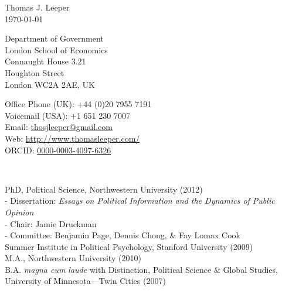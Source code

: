 \documentclass[12pt]{article}
\renewcommand{\section}[1]{\pagebreak[3]%
    \llap{\scshape\smash{\parbox[t]{\marginparwidth}{\raggedright {\color{lg}#1}}}}%
    \vspace{-\baselineskip}\par}
\newcommand{\entry}[1]{\indent {\color{lg}\guillemotright}\hspace{2pt}#1\vspace{.25em}\\}
\newcommand{\subentry}[1]{{\color{lg}-} #1\vspace{.25em}\\}
\begin{document}
{\LARGE Thomas J. Leeper}\\

\today\\

\begin{minipage}[b]{0.5\linewidth}
Department of Government\\
London School of Economics\\
Connaught House 3.21\\
Houghton Street\\
London WC2A 2AE, UK
\end{minipage}
\begin{minipage}[b]{0.5\linewidth}
Office Phone (UK): +44 (0)20 7955 7191\\
Voicemail (USA): +1 651 230 7007\\
Email: \href{mailto:thosjleeper@gmail.com}{thosjleeper@gmail.com}\\
Web: \href{http://www.thomasleeper.com/}{http://www.thomasleeper.com/}\\
ORCID: \href{http://orcid.org/0000-0003-4097-6326}{0000-0003-4097-6326}
\end{minipage}\\

\section{Education}
\entry{PhD, Political Science, Northwestern University (2012)}
	\subentry{Dissertation: \textit{Essays on Political Information and the Dynamics of Public Opinion}}
	\subentry{Chair: Jamie Druckman}
	\subentry{Committee: Benjamin Page, Dennis Chong, \& Fay Lomax Cook}
\entry{Summer Institute in Political Psychology, Stanford University (2009)}
\entry{M.A., Northwestern University (2010)}
\entry{B.A. \textit{magna cum laude} with Distinction, Political Science \& Global Studies, University of Minnesota---Twin Cities (2007)}
\end{document}
